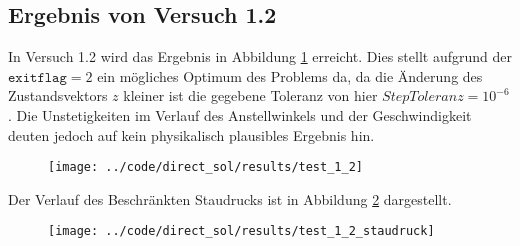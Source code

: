 \subsection{Ergebnis von Versuch 1.2}\label{kap:Versuch12}
In Versuch 1.2 wird das Ergebnis in Abbildung \ref{img:test_1_2} erreicht. Dies stellt aufgrund der $\texttt{exitflag} = 2$ ein mögliches Optimum des Problems da, da die Änderung des Zustandsvektors $z$ kleiner ist die gegebene Toleranz von hier $StepToleranz = 10^{-6}$. Die Unstetigkeiten im Verlauf des Anstellwinkels und der Geschwindigkeit deuten jedoch auf kein physikalisch plausibles Ergebnis hin.
\begin{figure}[H]
\begin{center}
\texttt{[image: ../code/direct\_sol/results/test\_1\_2]}
 \label{img:test_1_2}
\end{center}
\end{figure}
Der Verlauf des Beschränkten Staudrucks ist in Abbildung \ref{img:test_1_2_staudruck} dargestellt.
\begin{figure}[H]
\begin{center}
\texttt{[image: ../code/direct\_sol/results/test\_1\_2\_staudruck]}
\label{img:test_1_2_staudruck}
\end{center}
\end{figure}
















\newpage

